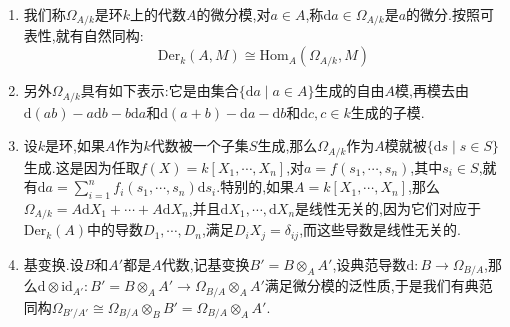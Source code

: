 \begin{enumerate}
\begin{proof}
		接下来我们断言$\Omega_{A/k}$被全体$\{\mathrm{d}a\mid a\in A\}$生成,这就保证了满足$D=f\circ\mathrm{d}$的模同态$f$是唯一的.按照$a\otimes a'=(a\otimes1)(1\otimes a'-a'\otimes1)+aa'\otimes1$,于是如果$\sum_ix_i\otimes y_i\in I$,那么在$\mathrm{mod}I^2$下就有$\sum_ix_i\otimes y_i\equiv\sum x_i\mathrm{d}y_i+\sum_ix_iy_i\otimes1=\sum x_i\mathrm{d}y_i$.
	\end{proof}
	\item 我们称$\Omega_{A/k}$是环$k$上的代数$A$的微分模,对$a\in A$,称$\mathrm{d}a\in\Omega_{A/k}$是$a$的微分.按照可表性,就有自然同构:
	$$\mathrm{Der}_k(A,M)\cong\mathrm{Hom}_A(\Omega_{A/k},M)$$
    \item 另外$\Omega_{A/k}$具有如下表示:它是由集合$\{\mathrm{d}a\mid a\in A\}$生成的自由$A$模,再模去由$\mathrm{d}(ab)-a\mathrm{d}b-b\mathrm{d}a$和$\mathrm{d}(a+b)-\mathrm{d}a-\mathrm{d}b$和$\mathrm{d}c,c\in k$生成的子模.
	\item 设$k$是环,如果$A$作为$k$代数被一个子集$S$生成,那么$\Omega_{A/k}$作为$A$模就被$\{\mathrm{d}s\mid s\in S\}$生成.这是因为任取$f(X)=k[X_1,\cdots,X_n]$,对$a=f(s_1,\cdots,s_n)$,其中$s_i\in S$,就有$\mathrm{d}a=\sum_{i=1}^nf_i(s_1,\cdots,s_n)\mathrm{d}s_i$.特别的,如果$A=k[X_1,\cdots,X_n]$,那么$\Omega_{A/k}=A\mathrm{d}X_1+\cdots+A\mathrm{d}X_n$,并且$\mathrm{d}X_1,\cdots,\mathrm{d}X_n$是线性无关的,因为它们对应于$\mathrm{Der}_k(A)$中的导数$D_1,\cdots,D_n$,满足$D_iX_j=\delta_{ij}$,而这些导数是线性无关的.
	\item 基变换.设$B$和$A'$都是$A$代数,记基变换$B'=B\otimes_AA'$,设典范导数$\mathrm{d}:B\to\Omega_{B/A}$,那么$\mathrm{d}\otimes\mathrm{id}_{A'}:B'=B\otimes_AA'\to\Omega_{B/A}\otimes_AA'$满足微分模的泛性质,于是我们有典范同构$\Omega_{B'/A'}\cong\Omega_{B/A}\otimes_BB'=\Omega_{B/A}\otimes_AA'$.
\end{enumerate}

